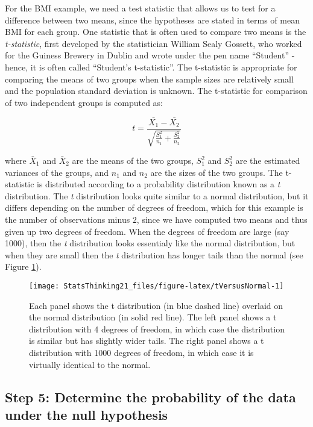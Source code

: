 \documentclass[]{book}
\theoremstyle{definition}
\theoremstyle{definition}
\theoremstyle{definition}
\theoremstyle{remark}
\begin{document}
For the BMI example, we need a test statistic that allows us to test for
a difference between two means, since the hypotheses are stated in terms
of mean BMI for each group. One statistic that is often used to compare
two means is the \emph{t-statistic}, first developed by the statistician
William Sealy Gossett, who worked for the Guiness Brewery in Dublin and
wrote under the pen name ``Student'' - hence, it is often called
``Student's t-statistic''. The t-statistic is appropriate for comparing
the means of two groups when the sample sizes are relatively small and
the population standard deviation is unknown. The t-statistic for
comparison of two independent groups is computed as:

\[
t = \frac{\bar{X_1} - \bar{X_2}}{\sqrt{\frac{S_1^2}{n_1} + \frac{S_2^2}{n_2}}}
\]

where \(\bar{X}_1\) and \(\bar{X}_2\) are the means of the two groups,
\(S^2_1\) and \(S^2_2\) are the estimated variances of the groups, and
\(n_1\) and \(n_2\) are the sizes of the two groups. The t-statistic is
distributed according to a probability distribution known as a \emph{t}
distribution. The \emph{t} distribution looks quite similar to a normal
distribution, but it differs depending on the number of degrees of
freedom, which for this example is the number of observations minus 2,
since we have computed two means and thus given up two degrees of
freedom. When the degrees of freedom are large (say 1000), then the
\emph{t} distribution looks essentialy like the normal distribution, but
when they are small then the \emph{t} distribution has longer tails than
the normal (see Figure \ref{fig:tVersusNormal}).

\begin{figure}
\texttt{[image: StatsThinking21\_files/figure-latex/tVersusNormal-1]} \caption{Each panel shows the t distribution (in blue dashed line) overlaid on the normal distribution (in solid red line).  The left panel shows a t distribution with 4 degrees of freedom, in which case the distribution is similar but has slightly wider tails.  The right panel shows a t distribution with 1000 degrees of freedom, in which case it is virtually identical to the normal.}\label{fig:tVersusNormal}
\end{figure}

\subsection{Step 5: Determine the probability of the data under the null
hypothesis}\label{step-5-determine-the-probability-of-the-data-under-the-null-hypothesis}
\end{document}
